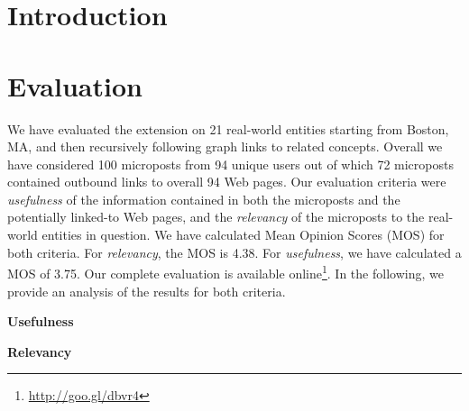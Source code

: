 \documentclass[runningheads,a4paper]{llncs}
\begin{document}
\section{Introduction}

\section{Evaluation}
We have evaluated the extension on 21 real-world entities starting from
Boston, MA, and then recursively following graph links to related concepts.
Overall we have considered 100 microposts from 94 unique users
out of which 72 microposts contained outbound links to overall 94 Web pages.
Our evaluation criteria were \emph{usefulness} of the information
contained in both the microposts and the potentially linked-to Web pages,
and the \emph{relevancy} of the microposts to the real-world entities in question.
We have calculated Mean Opinion Scores (MOS) for both criteria.
For \emph{relevancy}, the MOS is 4.38.
For \emph{usefulness}, we have calculated a MOS of 3.75.
Our complete evaluation is available online\footnote{\url{http://goo.gl/dbvr4}}.
In the following, we provide an analysis of the results for both criteria.

\noindent \textbf{Usefulness}

\noindent \textbf{Relevancy}





\end{document}

